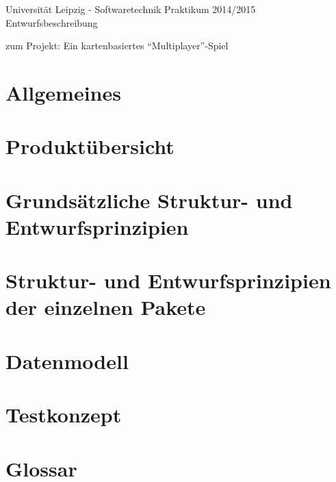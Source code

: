 \documentclass[11pt,a4paper]{article}
\begin{document}
\center \large Universität Leipzig - Softwaretechnik Praktikum 2014/2015\\
\center \Huge Entwurfsbeschreibung\\
\par\bigskip

\small zum Projekt: Ein kartenbasiertes “Multiplayer”-Spiel

\par\bigskip

\tableofcontents

\clearpage

\flushleft
\section{Allgemeines}
\clearpage
\section{Produktübersicht}
\clearpage
\section{Grundsätzliche Struktur- und Entwurfsprinzipien}
\clearpage
\section{Struktur- und Entwurfsprinzipien der einzelnen Pakete}
\clearpage
\section{Datenmodell}
\clearpage
\section{Testkonzept}
\clearpage
\section{Glossar}
\clearpage
\end{document}
